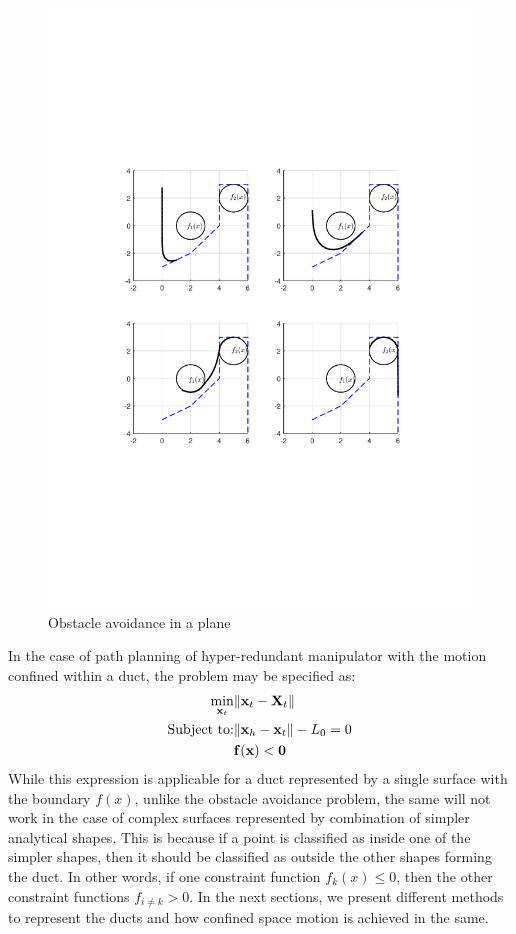 \documentclass[12pt,a4]{article}
\begin{document}
\begin{figure}[h!]
\centering
\includegraphics[scale=0.75]{figures/fig3.pdf}
\caption{Obstacle avoidance in a plane\label{fig:obstacle_avoidance_2D}}
\end{figure}

In the case of path planning of hyper-redundant manipulator with the motion confined within a duct, the problem may be specified as:
\begin{align} \label{eq:path_planning_opt}
\min_{\textbf{x}_t} &\Vert \textbf{x}_t-\textbf{X}_t \Vert\\
\text{Subject to:} &\Vert \textbf{x}_h - \textbf{x}_t \Vert -L_0 = 0 \nonumber \\
 ~~ &\bf{f}(x) <0 \nonumber
\end{align}
While this expression is applicable for a duct represented by a single surface with the boundary $f(x)$, unlike the obstacle avoidance problem, the same will not work in the case of complex surfaces represented by combination of simpler analytical shapes. This is because if a point is classified as inside one of the simpler shapes, then it should be classified as outside the other shapes forming the duct. In other words, if one constraint function $f_k(x)\le 0$, then the other constraint functions $f_{i\neq k}>0$. In the next sections, we present different methods to represent the ducts and how confined space motion is achieved in the same.
\end{document}

